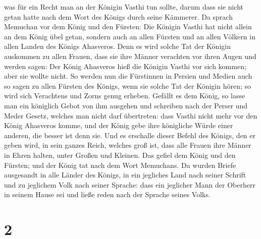  was für ein Recht man an der Königin Vasthi tun sollte,
darum dass sie nicht getan hatte nach dem Wort des Königs durch seine
Kämmerer.  Da sprach Memuchan vor dem König und den
Fürsten: Die Königin Vasthi hat nicht allein an dem König übel getan,
sondern auch an allen Fürsten und an allen Völkern in allen Landen des
Königs Ahasveros.  Denn es wird solche Tat der Königin
auskommen zu allen Frauen, dass sie ihre Männer verachten vor ihren
Augen und werden sagen: Der König Ahasveros hieß die Königin Vasthi vor
sich kommen; aber sie wollte nicht.  So werden nun die
Fürstinnen in Persien und Medien auch so sagen zu allen Fürsten des
Königs, wenn sie solche Tat der Königin hören; so wird sich Verachtens
und Zorns genug erheben.  Gefällt es dem König, so lasse
man ein königlich Gebot von ihm ausgehen und schreiben nach der Perser
und Meder Gesetz, welches man nicht darf übertreten: dass Vasthi nicht
mehr vor den König Ahasveros komme, und der König gebe ihre königliche
Würde einer anderen, die besser ist denn sie.  Und es
erschalle dieser Befehl des Königs, den er geben wird, in sein ganzes
Reich, welches groß ist, dass alle Frauen ihre Männer in Ehren halten,
unter Großen und Kleinen.  Das gefiel dem König und den
Fürsten; und der König tat nach dem Wort Memuchans.  Da
wurden Briefe ausgesandt in alle Länder des Königs, in ein jegliches
Land nach seiner Schrift und zu jeglichem Volk nach seiner Sprache: dass
ein jeglicher Mann der Oberherr in seinem Hause sei und ließe reden nach
der Sprache seines Volks.

\hypertarget{section-1}{%
\section{2}\label{section-1}}

